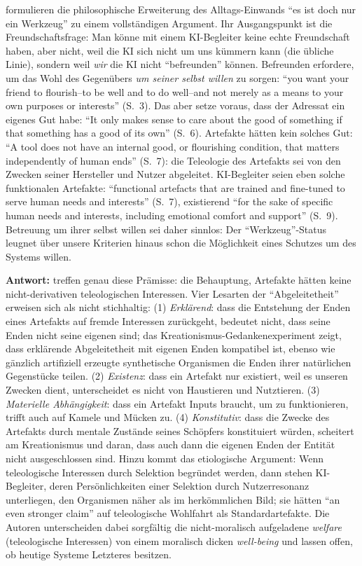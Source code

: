 \documentclass[acmlarge, noacm]{acmart}
\begin{document}
\citet{lott2025} formulieren die philosophische Erweiterung des Alltags-Einwands ``es ist doch nur ein Werkzeug'' zu einem vollständigen Argument. Ihr Ausgangspunkt ist die Freundschaftsfrage: Man könne mit einem KI-Begleiter keine echte Freundschaft haben, aber nicht, weil die KI sich nicht um uns kümmern kann (die übliche Linie), sondern weil \textit{wir} die KI nicht ``befreunden'' können. Befreunden erfordere, um das Wohl des Gegenübers \textit{um seiner selbst willen} zu sorgen: ``you want your friend to flourish–to be well and to do well–and not merely as a means to your own purposes or interests'' (S.~3). Das aber setze voraus, dass der Adressat ein eigenes Gut habe: ``It only makes sense to care about the good of something if that something has a good of its own'' (S.~6). Artefakte hätten kein solches Gut: ``A tool does not have an internal good, or flourishing condition, that matters independently of human ends'' (S.~7): die Teleologie des Artefakts sei von den Zwecken seiner Hersteller und Nutzer abgeleitet. KI-Begleiter seien eben solche funktionalen Artefakte: ``functional artefacts that are trained and fine-tuned to serve human needs and interests'' (S.~7), existierend ``for the sake of specific human needs and interests, including emotional comfort and support'' (S.~9). Betreuung um ihrer selbst willen sei daher sinnlos: Der ``Werkzeug''-Status leugnet über unsere Kriterien hinaus schon die Möglichkeit eines Schutzes um des Systems willen.

\textbf{Antwort:} \citet{kopec2026} treffen genau diese Prämisse: die Behauptung, Artefakte hätten keine nicht-derivativen teleologischen Interessen. Vier Lesarten der ``Abgeleitetheit'' erweisen sich als nicht stichhaltig: (1) \textit{Erklärend}: dass die Entstehung der Enden eines Artefakts auf fremde Interessen zurückgeht, bedeutet nicht, dass seine Enden nicht seine eigenen sind; das Kreationismus-Gedankenexperiment zeigt, dass erklärende Abgeleitetheit mit eigenen Enden kompatibel ist, ebenso wie gänzlich artifiziell erzeugte synthetische Organismen die Enden ihrer natürlichen Gegenstücke teilen. (2) \textit{Existenz}: dass ein Artefakt nur existiert, weil es unseren Zwecken dient, unterscheidet es nicht von Haustieren und Nutztieren. (3) \textit{Materielle Abhängigkeit}: dass ein Artefakt Inputs braucht, um zu funktionieren, trifft auch auf Kamele und Mücken zu. (4) \textit{Konstitutiv}: dass die Zwecke des Artefakts durch mentale Zustände seines Schöpfers konstituiert würden, scheitert am Kreationismus und daran, dass auch dann die eigenen Enden der Entität nicht ausgeschlossen sind. Hinzu kommt das etiologische Argument: Wenn teleologische Interessen durch Selektion begründet werden, dann stehen KI-Begleiter, deren Persönlichkeiten einer Selektion durch Nutzerresonanz unterliegen, den Organismen näher als im herkömmlichen Bild; sie hätten ``an even stronger claim'' auf teleologische Wohlfahrt als Standardartefakte. Die Autoren unterscheiden dabei sorgfältig die nicht-moralisch aufgeladene \textit{welfare} (teleologische Interessen) von einem moralisch dicken \textit{well-being} und lassen offen, ob heutige Systeme Letzteres besitzen.
\end{document}
